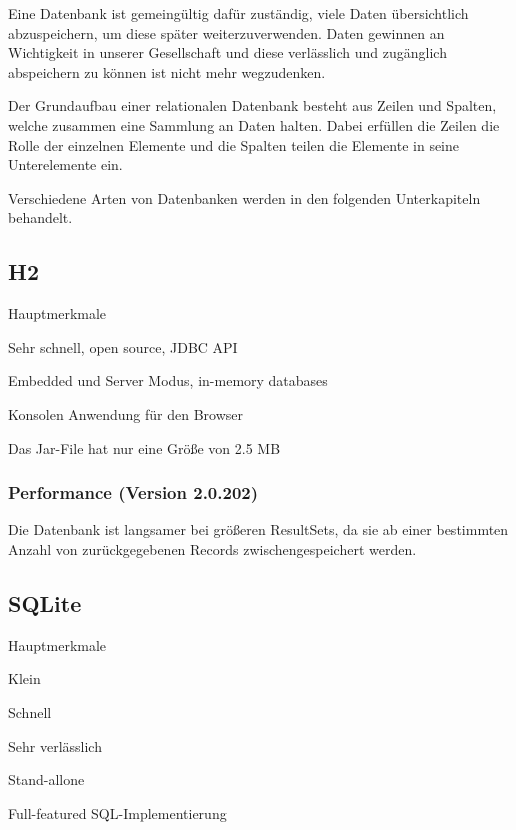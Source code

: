 
Eine Datenbank ist gemeingültig dafür zuständig, viele Daten übersichtlich abzuspeichern, um diese später weiterzuverwenden. Daten gewinnen an Wichtigkeit in unserer Gesellschaft und diese verlässlich und zugänglich abspeichern zu können ist nicht mehr wegzudenken.
 
Der Grundaufbau einer relationalen Datenbank besteht aus Zeilen und Spalten, welche zusammen eine Sammlung an Daten halten. Dabei erfüllen die Zeilen die Rolle der einzelnen Elemente und die Spalten teilen die Elemente in seine Unterelemente ein. \cite{javaInselBuch}
 
 Verschiedene Arten von Datenbanken werden in den folgenden Unterkapiteln behandelt.

\subsection{H2}
\begin{compactitem} 
    \item[Hauptmerkmale]
    \item Sehr schnell, open source, JDBC API
    \item Embedded und Server Modus, in-memory databases        
    \item Konsolen Anwendung für den Browser
    \item Das Jar-File hat nur eine Größe von 2.5 MB
\end{compactitem} 
\cite{databaseComparison}


\subsubsection{Performance (Version 2.0.202)}
Die Datenbank ist langsamer bei größeren ResultSets, da sie ab einer bestimmten Anzahl von zurückgegebenen Records zwischengespeichert werden. \cite{databaseComparison}


 
\subsection{SQLite}

\begin{compactitem}
    \item [Hauptmerkmale]
    \item Klein
    \item Schnell        
    \item Sehr verlässlich
    \item Stand-allone
    \item Full-featured SQL-Implementierung
\end{compactitem} 
\cite{sqlliteOfficialSite}

